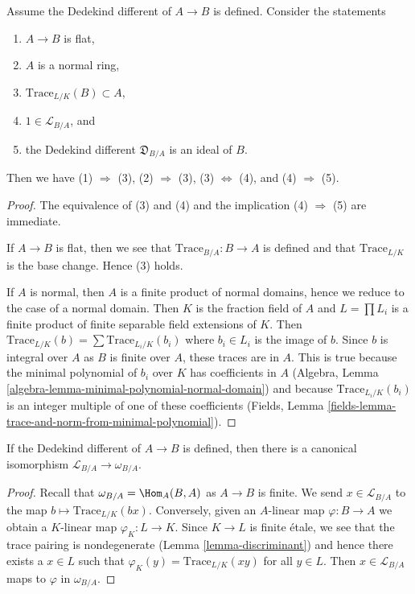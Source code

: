 \begin{lemma}
\label{lemma-dedekind-different-ideal}
Assume the Dedekind different of $A \to B$ is defined. Consider the statements
\begin{enumerate}
\item $A \to B$ is flat,
\item $A$ is a normal ring,
\item $\text{Trace}_{L/K}(B) \subset A$,
\item $1 \in \mathcal{L}_{B/A}$, and
\item the Dedekind different $\mathfrak{D}_{B/A}$ is an ideal of $B$.
\end{enumerate}
Then we have (1) $\Rightarrow$ (3), (2) $\Rightarrow$ (3),
(3) $\Leftrightarrow$ (4), and (4) $\Rightarrow$ (5).
\end{lemma}

\begin{proof}
The equivalence of (3) and (4) and the
implication (4) $\Rightarrow$ (5) are immediate.

\medskip\noindent
If $A \to B$ is flat, then we see that $\text{Trace}_{B/A} : B \to A$ is
defined and that $\text{Trace}_{L/K}$ is the base change. Hence (3) holds.

\medskip\noindent
If $A$ is normal, then $A$ is a finite product of normal domains,
hence we reduce to the case of a normal domain. Then $K$ is
the fraction field of $A$ and $L = \prod L_i$ is a finite product of
finite separable field extensions of $K$. Then
$\text{Trace}_{L/K}(b) = \sum \text{Trace}_{L_i/K}(b_i)$
where $b_i \in L_i$ is the image of $b$.
Since $b$ is integral over $A$ as $B$ is finite over $A$,
these traces are in $A$. This is true because the
minimal polynomial of $b_i$ over $K$ has coefficients in $A$
(Algebra, Lemma \ref{algebra-lemma-minimal-polynomial-normal-domain})
and because $\text{Trace}_{L_i/K}(b_i)$ is an
integer multiple of one of these coefficients
(Fields, Lemma \ref{fields-lemma-trace-and-norm-from-minimal-polynomial}).
\end{proof}

\begin{lemma}
\label{lemma-dedekind-complementary-module}
If the Dedekind different of $A \to B$ is defined, then
there is a canonical isomorphism
$\mathcal{L}_{B/A} \to \omega_{B/A}$.
\end{lemma}

\begin{proof}
Recall that $\omega_{B/A} = \Hom_A(B, A)$ as $A \to B$ is finite.
We send $x \in \mathcal{L}_{B/A}$ to the map
$b \mapsto \text{Trace}_{L/K}(bx)$.
Conversely, given an $A$-linear map $\varphi : B \to A$
we obtain a $K$-linear map $\varphi_K : L \to K$. Since $K \to L$ is finite
\'etale, we see that the trace pairing is nondegenerate
(Lemma \ref{lemma-discriminant}) and hence there exists a $x \in L$ such that
$\varphi_K(y) = \text{Trace}_{L/K}(xy)$ for all $y \in L$.
Then $x \in \mathcal{L}_{B/A}$ maps to $\varphi$ in $\omega_{B/A}$.
\end{proof}

